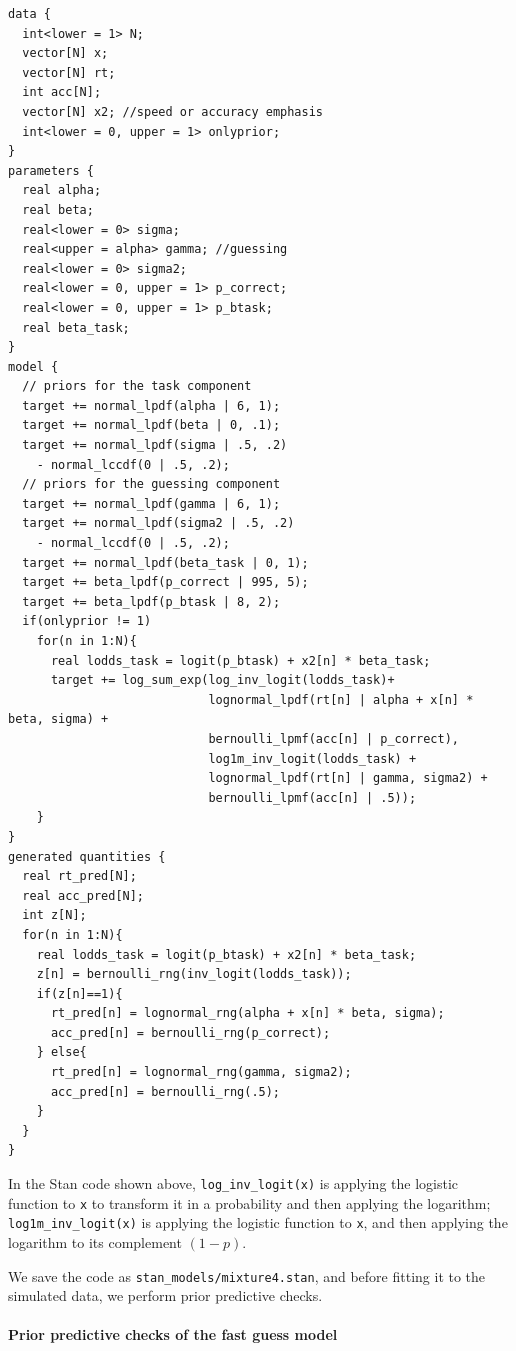 \documentclass[12pt,]{krantz}
\let\oldparagraph\paragraph
\renewcommand{\paragraph}[1]{\oldparagraph{#1}\mbox{}}
\theoremstyle{definition}
\theoremstyle{definition}
\theoremstyle{definition}
\theoremstyle{remark}
\begin{document}
\begin{verbatim}
data {
  int<lower = 1> N;
  vector[N] x;
  vector[N] rt;
  int acc[N];
  vector[N] x2; //speed or accuracy emphasis
  int<lower = 0, upper = 1> onlyprior;
}
parameters {
  real alpha;
  real beta;
  real<lower = 0> sigma;
  real<upper = alpha> gamma; //guessing
  real<lower = 0> sigma2;
  real<lower = 0, upper = 1> p_correct;
  real<lower = 0, upper = 1> p_btask;
  real beta_task;
}
model {
  // priors for the task component
  target += normal_lpdf(alpha | 6, 1);
  target += normal_lpdf(beta | 0, .1);
  target += normal_lpdf(sigma | .5, .2)
    - normal_lccdf(0 | .5, .2);
  // priors for the guessing component
  target += normal_lpdf(gamma | 6, 1);
  target += normal_lpdf(sigma2 | .5, .2)
    - normal_lccdf(0 | .5, .2);
  target += normal_lpdf(beta_task | 0, 1);
  target += beta_lpdf(p_correct | 995, 5);
  target += beta_lpdf(p_btask | 8, 2);
  if(onlyprior != 1)
    for(n in 1:N){
      real lodds_task = logit(p_btask) + x2[n] * beta_task;
      target += log_sum_exp(log_inv_logit(lodds_task)+
                            lognormal_lpdf(rt[n] | alpha + x[n] * beta, sigma) +
                            bernoulli_lpmf(acc[n] | p_correct),
                            log1m_inv_logit(lodds_task) +
                            lognormal_lpdf(rt[n] | gamma, sigma2) +
                            bernoulli_lpmf(acc[n] | .5));
    }
}
generated quantities {
  real rt_pred[N];
  real acc_pred[N];
  int z[N]; 
  for(n in 1:N){
    real lodds_task = logit(p_btask) + x2[n] * beta_task;
    z[n] = bernoulli_rng(inv_logit(lodds_task));
    if(z[n]==1){
      rt_pred[n] = lognormal_rng(alpha + x[n] * beta, sigma);
      acc_pred[n] = bernoulli_rng(p_correct);
    } else{
      rt_pred[n] = lognormal_rng(gamma, sigma2);
      acc_pred[n] = bernoulli_rng(.5);
    }
  }
}
\end{verbatim}

In the Stan code shown above, \texttt{log\_inv\_logit(x)} is applying
the logistic function to \texttt{x} to transform it in a probability and
then applying the logarithm; \texttt{log1m\_inv\_logit(x)} is applying
the logistic function to \texttt{x}, and then applying the logarithm to
its complement \((1 - p)\).

We save the code as \texttt{stan\_models/mixture4.stan}, and before
fitting it to the simulated data, we perform prior predictive checks.

\paragraph{Prior predictive checks of the fast guess
model}\label{prior-predictive-checks-of-the-fast-guess-model}
\end{document}
